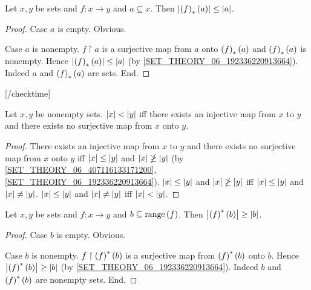 \documentclass[../set-theory.tex]{subfiles}
\begin{document}
  \begin{forthel}
    [checktime 2]

    \begin{proposition}
      Let $x, y$ be sets and $f : x \to y$ and $a \subseteq x$.
      Then $\left\vert\left(f\right)_{*}(a)\right\vert \leq \left\vert a\right\vert$.
    \end{proposition}
    \begin{proof}
      Case $a$ is empty. Obvious.

      Case $a$ is nonempty.
        $f \restriction a$ is a surjective map from $a$ onto $\left(f\right)_{*}(a)$ and $\left(f\right)_{*}(a)$
        is nonempty.
        Hence $\left\vert\left(f\right)_{*}(a)\right\vert \leq \left\vert a\right\vert$ (by \cref{SET_THEORY_06_192336220913664}).
        Indeed $a$ and $\left(f\right)_{*}(a)$ are sets.
      End.
    \end{proof}

    [/checktime]
  \end{forthel}

  \begin{forthel}
    \begin{proposition}
      Let $x, y$ be nonempty sets.
      $\left\vert x\right\vert < \left\vert y\right\vert$ iff there exists an injective map from $x$ to $y$ and there
      exists no surjective map from $x$ onto $y$.
    \end{proposition}
    \begin{proof}
      There exists an injective map from $x$ to $y$ and there exists no
      surjective map from $x$ onto $y$ iff $\left\vert x\right\vert \leq \left\vert y\right\vert$ and $\left\vert x\right\vert \ngeq \left\vert y\right\vert$
      (by \cref{SET_THEORY_06_407116133171200},
      \cref{SET_THEORY_06_192336220913664}).
      $\left\vert x\right\vert \leq \left\vert y\right\vert$ and $\left\vert x\right\vert \ngeq \left\vert y\right\vert$ iff $\left\vert x\right\vert \leq \left\vert y\right\vert$ and $\left\vert x\right\vert \neq \left\vert y\right\vert$.
      $\left\vert x\right\vert \leq \left\vert y\right\vert$ and $\left\vert x\right\vert \neq \left\vert y\right\vert$ iff $\left\vert x\right\vert < \left\vert y\right\vert$.
    \end{proof}
  \end{forthel}

  \begin{forthel}
    \begin{proposition}
      Let $x, y$ be sets and $f : x \to y$ and $b \subseteq \mathrm{range}\left(f\right)$.
      Then $\left\vert\left(f\right)^{*}(b)\right\vert \geq \left\vert b\right\vert$.
    \end{proposition}
    \begin{proof}
      Case $b$ is empty. Obvious.

      Case $b$ is nonempty.
        $f \restriction \left(f\right)^{*}(b)$ is a surjective map from $\left(f\right)^{*}(b)$ onto $b$.
        Hence $\left\vert\left(f\right)^{*}(b)\right\vert \geq \left\vert b\right\vert$ (by \cref{SET_THEORY_06_192336220913664}).
        Indeed $b$ and $\left(f\right)^{*}(b)$ are nonempty sets.
      End.
    \end{proof}
  \end{forthel}
\end{document}
